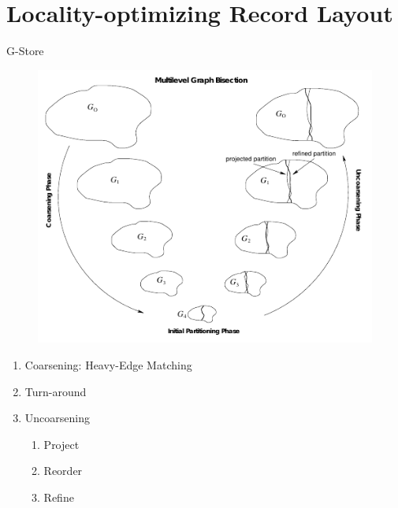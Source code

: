 \documentclass[rgb]{beamer}
\begin{document}
    \section{Locality-optimizing Record Layout}
        \begin{frame}{G-Store}
            \begin{figure}[H]
                \begin{center}
                \includegraphics[keepaspectratio, height=0.8\textheight, width=\textwidth]{img/multilevel.png}\\
                \end{center}
            \end{figure}
            
            \framebreak
            \vfill\vspace{0pt}
            \begin{enumerate}
             \item Coarsening: Heavy-Edge Matching
             \item Turn-around
             \item Uncoarsening
                \begin{enumerate}
                 \item Project
                 \item Reorder
                 \item Refine
                \end{enumerate}
            \end{enumerate}
            

\end{frame}
\end{document}
